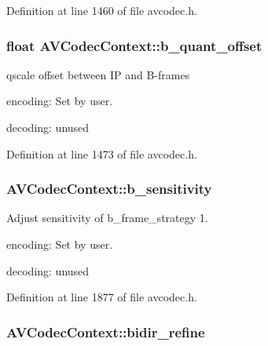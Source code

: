 Definition at line 1460 of file avcodec.\+h.

\subsubsection[{\texorpdfstring{b\+\_\+quant\+\_\+offset}{b_quant_offset}}]{\setlength{\rightskip}{0pt plus 5cm}float A\+V\+Codec\+Context\+::b\+\_\+quant\+\_\+offset}\hypertarget{struct_a_v_codec_context_a31a2ef78cf186083c2c676dda8e226db}{}\label{struct_a_v_codec_context_a31a2ef78cf186083c2c676dda8e226db}
qscale offset between IP and B-\/frames
\begin{DoxyItemize}
\item encoding\+: Set by user.
\item decoding\+: unused 
\end{DoxyItemize}

Definition at line 1473 of file avcodec.\+h.

\subsubsection[{\texorpdfstring{b\+\_\+sensitivity}{b_sensitivity}}]{ A\+V\+Codec\+Context\+::b\+\_\+sensitivity}\hypertarget{struct_a_v_codec_context_ab061daa4576c7c17288a9aac7ee8d69b}{}\label{struct_a_v_codec_context_ab061daa4576c7c17288a9aac7ee8d69b}
Adjust sensitivity of b\+\_\+frame\+\_\+strategy 1.
\begin{DoxyItemize}
\item encoding\+: Set by user.
\item decoding\+: unused 
\end{DoxyItemize}

Definition at line 1877 of file avcodec.\+h.

\subsubsection[{\texorpdfstring{bidir\+\_\+refine}{bidir_refine}}]{ A\+V\+Codec\+Context\+::bidir\+\_\+refine}\hypertarget{struct_a_v_codec_context_a4df462fdb6b38432ecfd37f30c1d082c}{}\label{struct_a_v_codec_context_a4df462fdb6b38432ecfd37f30c1d082c}

